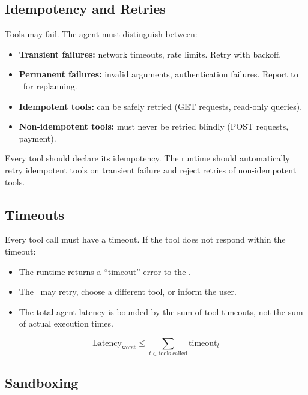 \subsection{Idempotency and Retries}

Tools may fail. The agent must distinguish between:
\begin{itemize}
	\item \textbf{Transient failures:} network timeouts, rate limits. Retry with backoff.
	\item \textbf{Permanent failures:} invalid arguments, authentication failures. Report to \llm\ for replanning.
	\item \textbf{Idempotent tools:} can be safely retried (GET requests, read-only queries).
	\item \textbf{Non-idempotent tools:} must never be retried blindly (POST requests, payment).
\end{itemize}

\begin{principle}
	Every tool should declare its idempotency. The runtime should automatically retry idempotent tools on transient failure and reject retries of non-idempotent tools.
\end{principle}

\subsection{Timeouts}

Every tool call must have a timeout. If the tool does not respond within the timeout:
\begin{itemize}
	\item The runtime returns a ``timeout'' error to the \llm.
	\item The \llm\ may retry, choose a different tool, or inform the user.
	\item The total agent latency is bounded by the sum of tool timeouts, not the sum of actual execution times.
\end{itemize}

\begin{equation}
	\text{Latency}_{\text{worst}} \leq \sum_{t \in \text{tools called}} \text{timeout}_t
\end{equation}

\subsection{Sandboxing}

